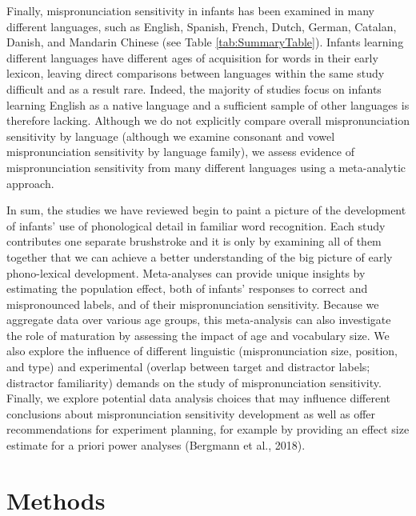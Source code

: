 \documentclass[man]{apa6}
\begin{document}
Finally, mispronunciation sensitivity in infants has been examined in many different languages, such as English, Spanish, French, Dutch, German, Catalan, Danish, and Mandarin Chinese (see Table \ref{tab:SummaryTable}). Infants learning different languages have different ages of acquisition for words in their early lexicon, leaving direct comparisons between languages within the same study difficult and as a result rare. Indeed, the majority of studies focus on infants learning English as a native language and a sufficient sample of other languages is therefore lacking. Although we do not explicitly compare overall mispronunciation sensitivity by language (although we examine consonant and vowel mispronunciation sensitivity by language family), we assess evidence of mispronunciation sensitivity from many different languages using a meta-analytic approach.

In sum, the studies we have reviewed begin to paint a picture of the development of infants' use of phonological detail in familiar word recognition. Each study contributes one separate brushstroke and it is only by examining all of them together that we can achieve a better understanding of the big picture of early phono-lexical development. Meta-analyses can provide unique insights by estimating the population effect, both of infants' responses to correct and mispronounced labels, and of their mispronunciation sensitivity. Because we aggregate data over various age groups, this meta-analysis can also investigate the role of maturation by assessing the impact of age and vocabulary size. We also explore the influence of different linguistic (mispronunciation size, position, and type) and experimental (overlap between target and distractor labels; distractor familiarity) demands on the study of mispronunciation sensitivity. Finally, we explore potential data analysis choices that may influence different conclusions about mispronunciation sensitivity development as well as offer recommendations for experiment planning, for example by providing an effect size estimate for a priori power analyses (Bergmann et al., 2018).

\hypertarget{methods}{%
\section{Methods}\label{methods}}
\end{document}
